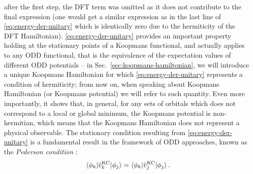 after the first step, the DFT term was omitted as it does not contribute to the final expression (one would get a similar expression as in the last line of \cref{eq:energy-der-unitary} which is identically zero due to the hermiticity of the DFT Hamiltonian). \cref{eq:energy-der-unitary} provides an important property holding at the stationary points of a Koopmans functional, and actually applies to any ODD functional, that is the equivalence of the expectation values of different ODD potentials -- in Sec.~\ref{sec:koopmans-hamiltonian}, we will introduce a unique Koopmans Hamiltonian for which \cref{eq:energy-der-unitary} represents a condition of hermiticity; from now on, when speaking about Koopmans Hamiltonian (or Koopmans potential) we will refer to such quantity. Even more importantly, it shows that, in general, for any sets of orbitals which does not correspond to a local or global minimum, the Koopmans potential is non-hermitian, which means that the Koopmans Hamiltonian does not represent a physical observable. The stationary condition resulting from \cref{eq:energy-der-unitary} is a fundamental result in the framework of ODD approaches, known as the \emph{Pederson condition} \cite{pederson_localdensity_1984,pederson_densityfunctional_1985}:
%
\begin{equation}
    \braket{\phi_k | \hat{v}^{\rm KC}_k | \phi_j} = \braket{\phi_k | \hat{v}^{\rm KC}_j | \phi_j} .
    \label{eq:pederson-condition}
\end{equation}

